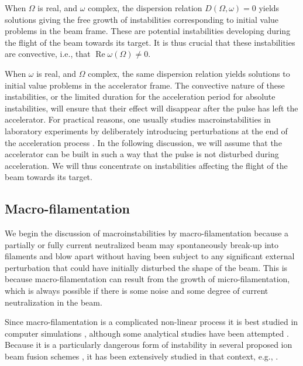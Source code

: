 \documentclass [12pt,a4paper,     ]{report} %
\newcommand{\REA}{\operatorname{Re}}  %
\begin{document}
	When $\Omega$ is real, and $\omega$ complex, the dispersion relation $D(\Omega,\omega) = 0$ yields  solutions giving the free growth of instabilities corresponding to initial value problems in the beam frame.  These are potential instabilities developing during the flight of the beam towards its target.  It is thus crucial that these instabilities are convective, i.e., that $\REA \omega(\Omega) \neq 0$.
	
	When $\omega$ is real, and $\Omega$ complex, the same dispersion relation yields solutions to initial value problems in the accelerator frame.  The convective nature of these instabilities, or the limited duration for the acceleration period for absolute instabilities, will ensure that their effect will disappear after the pulse has left the accelerator.  For practical reasons, one usually studies macroinstabilities in laboratory experiments by deliberately introducing perturbations at the end of the acceleration process \cite{LAUER1978-}.  In the following discussion, we will assume that the accelerator can be built in such a way that the pulse is not disturbed during acceleration.  We will thus concentrate on instabilities affecting the flight of the beam towards its target.

\subsection{Macro-filamentation}

   We begin the discussion of macroinstabilities by macro-filamentation because a partially or fully current neutralized beam may spontaneously break-up into filaments and blow apart without  having been subject to any significant external perturbation that could have initially disturbed the shape of the beam.  This is because macro-filamentation can result from the growth of micro-filamentation, which is always possible if there is some noise and some degree of current neutralization in the beam.

   Since macro-filamentation is  a complicated non-linear process it is best studied in computer simulations \cite{LEE--1973A}, although some analytical studies have been attempted \cite{BENFO1973-, MONTG1979-}.  Because it is a particularly dangerous form of instability in several proposed ion beam fusion  schemes \cite{OLSON1982-}, it has been extensively studied in that context, e.g., \cite{CALLA1977-, JORNA1978-, LEE--1980B}. 
\end{document}
